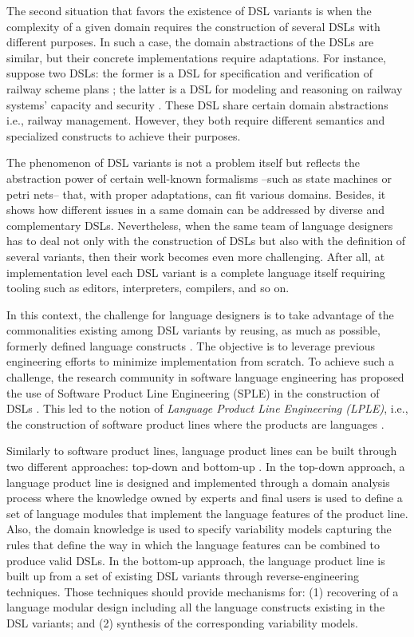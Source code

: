 The second situation that favors the existence of DSL variants is when the complexity of a given domain requires the construction of several DSLs with different purposes. In such a case, the domain abstractions of the DSLs are similar, but their concrete implementations require adaptations. For instance, suppose two DSLs: the former is a DSL for specification and verification of railway scheme plans \cite{James:2014}; the latter is a DSL for modeling and reasoning on railway systems' capacity and security \cite{Iliasov:2013}. These DSL share certain domain abstractions i.e., railway management. However, they both require different semantics and specialized constructs to achieve their purposes.

The phenomenon of DSL variants is not a problem itself but reflects the abstraction power of certain well-known formalisms --such as state machines or petri nets-- that, with proper adaptations, can fit various domains. Besides, it shows how different issues in a same domain can be addressed by diverse and complementary DSLs. Nevertheless, when the same team of language designers has to deal not only with the construction of DSLs but also with the definition of several variants, then their work becomes even more challenging. After all, at implementation level each DSL variant is a complete language itself requiring tooling such as editors, interpreters, compilers, and so on.

In this context, the challenge for language designers is to take advantage of the commonalities existing among DSL variants by reusing, as much as possible, formerly defined language constructs \cite{Zschaler:2010}. The objective is to leverage previous engineering efforts to minimize implementation from scratch. To achieve such a challenge, the research community in software language engineering has proposed the use of Software Product Line Engineering (SPLE) in the construction of DSLs \cite{White:2009}. This led to the notion of \textit{Language Product Line Engineering (LPLE)}, i.e., the construction of software product lines where the products are languages \cite{Zschaler:2010,Kuhn:2015}.

Similarly to software product lines, language product lines can be built through two different approaches: top-down and bottom-up \cite{Kuhn:2016}. In the top-down approach, a language product line is designed and implemented through a domain analysis process where the knowledge owned by experts and final users is used to define a set of language modules that implement the language features of the product line. Also, the domain knowledge is used to specify variability models capturing the rules that define the way in which the language features can be combined to produce valid DSLs. In the bottom-up approach, the language product line is built up from a set of existing DSL variants through reverse-engineering techniques. Those techniques should provide mechanisms for: (1) recovering of a language modular design including all the language constructs existing in the DSL variants; and (2) synthesis of the corresponding variability models. %

